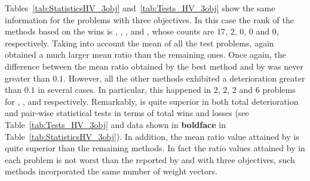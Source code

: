 Tables~\ref{tab:StatisticsHV_3obj} and~\ref{tab:Tests_HV_3obj} show the same information for the problems with three objectives.
%
In this case the rank of the methods based on the wins is \AVSDMOEAD{}, \RMOEA{}, \MOEADDE{}, \NSGAIII{} and \NSGAII{}, whose counts are $17$, $2$, $0$, $0$ and $0$, respectively.
%
%
Taking into account the mean of all the test problems, \AVSDMOEAD{} again obtained a much larger mean \HV{} ratio than the remaining ones.
%
Once again, the difference between the mean \HV{} ratio obtained by the best method and by \AVSDMOEAD{} was never greater than $0.1$.
%
However, all the other methods exhibited a deterioration greater than $0.1$ in several cases.
%
In particular, this happened in $2$, $2$, $2$ and $6$ problems for \MOEADDE{}, \RMOEA{}, \NSGAIII{} and \NSGAII{} respectively.
%
Remarkably, \AVSDMOEAD{} is quite superior in both total deterioration and pair-wise statistical tests in terms of total wins and losses (see Table~\ref{tab:Tests_HV_3obj} and data shown in {\bf boldface} in Table~\ref{tab:StatisticsHV_3obj}).
%
%
In addition, the mean \HV{} ratio value attained by \AVSDMOEAD{} is quite superior than the remaining methods.
%
In fact the \HV{} ratio values attained by \AVSDMOEAD{} in each problem is not worst than the reported by \MOEADDE{} and \NSGAIII{} with three objectives, such methods incorporated the same number of weight vectors.
%
%
%









